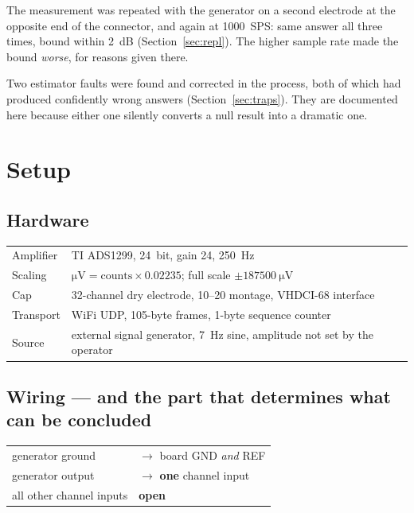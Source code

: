 \documentclass[11pt,a4paper]{article}
\begin{document}
The measurement was repeated with the generator on a second electrode at the opposite end of
the connector, and again at \SI{1000}{SPS}: same answer all three times, bound within
\SI{2}{\deci\bel} (Section~\ref{sec:repl}). The higher sample rate made the bound
\emph{worse}, for reasons given there.

Two estimator faults were found and corrected in the process, both of which had produced
confidently wrong answers (Section~\ref{sec:traps}). They are documented here because either
one silently converts a null result into a dramatic one.

\section{Setup}

\subsection*{Hardware}

\begin{center}
\begin{tabular}{ll}
\toprule
Amplifier & TI ADS1299, \SI{24}{bit}, gain 24, \SI{250}{\hertz} \\
Scaling & $\si{\micro\volt} = \text{counts} \times 0.02235$; full scale $\pm\SI{187500}{\micro\volt}$ \\
Cap & 32-channel dry electrode, 10--20 montage, VHDCI-68 interface \\
Transport & WiFi UDP, 105-byte frames, 1-byte sequence counter \\
Source & external signal generator, \SI{7}{\hertz} sine, amplitude not set by the operator \\
\bottomrule
\end{tabular}
\end{center}

\subsection*{Wiring --- and the part that determines what can be concluded}

\begin{center}
\begin{tabular}{ll}
generator ground & $\rightarrow$ board GND \emph{and} REF \\
generator output & $\rightarrow$ \textbf{one} channel input \\
all other channel inputs & \textbf{open} \\
\end{tabular}
\end{center}
\end{document}
